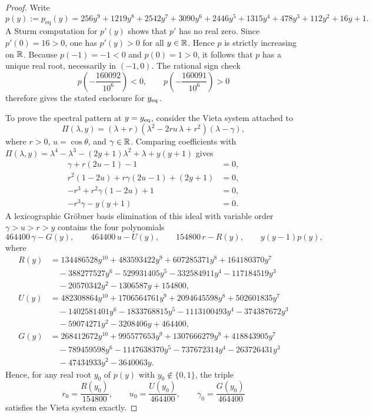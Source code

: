 \begin{proof}
Write
\[
p(y):=p_{\mathrm{eq}}(y)=256 y^9+1219 y^8+2542 y^7+3090 y^6+2446 y^5+1315 y^4+478 y^3+112 y^2+16 y+1.
\]
A Sturm computation for \(p'(y)\) shows that \(p'\) has no real zero.
Since \(p'(0)=16>0\), one has \(p'(y)>0\) for all \(y\in\mathbb{R}\).
Hence \(p\) is strictly increasing on \(\mathbb{R}\).
Because \(p(-1)=-1<0\) and \(p(0)=1>0\), it follows that \(p\) has a unique real root, necessarily in \((-1,0)\).
The rational sign check
\[
p\!\left(-\frac{160092}{10^6}\right)<0,\qquad
p\!\left(-\frac{160091}{10^6}\right)>0
\]
therefore gives the stated enclosure for \(y_{\mathrm{eq}}\).

To prove the spectral pattern at \(y=y_{\mathrm{eq}}\), consider the Vieta system attached to
\[
\Pi(\lambda,y)=(\lambda+r)(\lambda^2-2ru\,\lambda+r^2)(\lambda-\gamma),
\]
where \(r>0\), \(u=\cos\theta\), and \(\gamma\in\mathbb{R}\).
Comparing coefficients with \(\Pi(\lambda,y)=\lambda^4-\lambda^3-(2y+1)\lambda^2+\lambda+y(y+1)\) gives
\[
\begin{aligned}
\gamma+r(2u-1)-1&=0,\\
r^2(1-2u)+r\gamma(2u-1)+(2y+1)&=0,\\
-r^3+r^2\gamma(1-2u)+1&=0,\\
-r^3\gamma-y(y+1)&=0.
\end{aligned}
\]
A lexicographic Gr\"obner basis elimination of this ideal with variable order
\(\gamma>u>r>y\) contains the four polynomials
\[
464400\,\gamma-G(y),\qquad 464400\,u-U(y),\qquad 154800\,r-R(y),\qquad y(y-1)p(y),
\]
where
\begin{align*}
R(y)&=134486528y^{10}+483593422y^9+607285371y^8+164180370y^7\\
&\quad-388277527y^6-529931405y^5-332584911y^4-117184519y^3\\
&\quad-20570342y^2-1306587y+154800,\\[0.5ex]
U(y)&=482308864y^{10}+1706564761y^9+2094645598y^8+502601835y^7\\
&\quad-1402581401y^6-1833768815y^5-1113100493y^4-374387672y^3\\
&\quad-59074271y^2-3208406y+464400,\\[0.5ex]
G(y)&=268412672y^{10}+995577653y^9+1307666279y^8+418843905y^7\\
&\quad-789459598y^6-1147638370y^5-737672314y^4-263726431y^3\\
&\quad-47434933y^2-3640063y.
\end{align*}
Hence, for any real root \(y_0\) of \(p(y)\) with \(y_0\notin\{0,1\}\), the triple
\[
r_0=\frac{R(y_0)}{154800},\qquad
u_0=\frac{U(y_0)}{464400},\qquad
\gamma_0=\frac{G(y_0)}{464400}
\]
satisfies the Vieta system exactly.


\end{proof}
